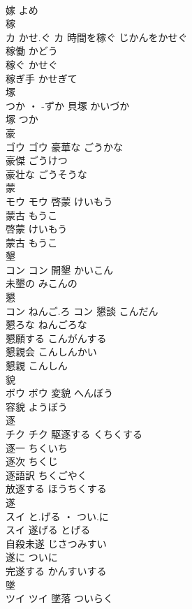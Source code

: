 \documentclass[8pt]{extreport}
\begin{document}
\begin{CJK}{UTF8}{min}
\\	嫁	よめ	
\\	稼	
\\	カ	かせ.ぐ	カ	時間を稼ぐ	じかんをかせぐ	
\\	稼働	かどう	
\\	稼ぐ	かせぐ	
\\	稼ぎ手	かせぎて	
\\	塚	
\\	つか ・ -ずか		貝塚	かいづか	
\\	塚	つか	
\\	豪	
\\	ゴウ		ゴウ	豪華な	ごうかな	
\\	豪傑	ごうけつ	
\\	豪壮な	ごうそうな	
\\	蒙	
\\	モウ		モウ	啓蒙	けいもう	
\\	蒙古	もうこ	
\\	啓蒙	けいもう	
\\	蒙古	もうこ	
\\	墾	
\\	コン		コン	開墾	かいこん	
\\	未墾の	みこんの	
\\	懇	
\\	コン	ねんご.ろ	コン	懇談	こんだん	
\\	懇ろな	ねんごろな	
\\	懇願する	こんがんする	
\\	懇親会	こんしんかい	
\\	懇親	こんしん	
\\	貌	
\\	ボウ		ボウ	変貌	へんぼう	
\\	容貌	ようぼう	
\\	逐	
\\	チク		チク	駆逐する	くちくする	
\\	逐一	ちくいち	
\\	逐次	ちくじ	
\\	逐語訳	ちくごやく	
\\	放逐する	ほうちくする	
\\	遂	
\\	スイ	と.げる ・ つい.に
\\	スイ	遂げる	とげる	
\\	自殺未遂	じさつみすい	
\\	遂に	ついに	
\\	完遂する	かんすいする	
\\	墜	
\\	ツイ		ツイ	墜落	ついらく	

\end{CJK}
\end{document}
